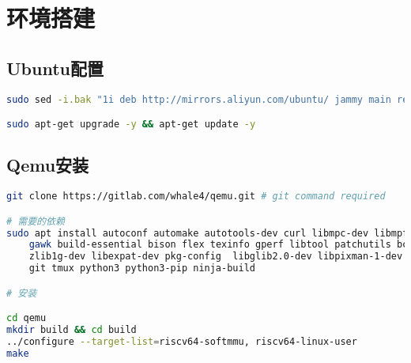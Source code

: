 \append


\section*{环境搭建}

\subsection*{Ubuntu配置}

\begin{lstlisting}[language=bash, caption = Ubuntu 的国内源]
sudo sed -i.bak "1i deb http://mirrors.aliyun.com/ubuntu/ jammy main restricted universe multiverse \ndeb-src http://mirrors.aliyun.com/ubuntu/ jammy main restricted universe multiverse \ndeb http://mirrors.aliyun.com/ubuntu/ jammy-security main restricted universe multiverse \ndeb-src http://mirrors.aliyun.com/ubuntu/ jammy-security main restricted universe multiverse \ndeb http://mirrors.aliyun.com/ubuntu/ jammy-updates main restricted universe multiverse \ndeb-src http://mirrors.aliyun.com/ubuntu/ jammy-updates main restricted universe multiverse \ndeb http://mirrors.aliyun.com/ubuntu/ jammy-proposed main restricted universe multiverse \ndeb-src http://mirrors.aliyun.com/ubuntu/ jammy-proposed main restricted universe multiverse \ndeb hthttp://mirrors.aliyun.com/ubuntu/tp://mirrors.aliyun.com/ubuntu/ jammy-backports main restricted universe multiverse \ndeb-src http://mirrors.aliyun.com/ubuntu/ jammy-backports main restricted universe multiverse" /etc/apt/sources.list

sudo apt-get upgrade -y && apt-get update -y
\end{lstlisting}

\subsection*{Qemu安装}

\begin{lstlisting}[language=bash, caption = Qemu安装]
git clone https://gitlab.com/whale4/qemu.git # git command required

# 需要的依赖
sudo apt install autoconf automake autotools-dev curl libmpc-dev libmpfr-dev libgmp-dev  \               
    gawk build-essential bison flex texinfo gperf libtool patchutils bc \
    zlib1g-dev libexpat-dev pkg-config  libglib2.0-dev libpixman-1-dev libsdl2-dev \
    git tmux python3 python3-pip ninja-build

# 安装

cd qemu
mkdir build && cd build
../configure --target-list=riscv64-softmmu, riscv64-linux-user
make
\end{lstlisting}

